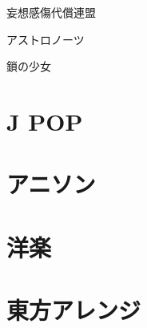 \documentclass[12pt, dvipdfmx]{jsarticle}
\begin{document}
妄想感傷代償連盟

アストロノーツ

鎖の少女

\section{J POP}



\section{アニソン}



\section{洋楽}




\section{東方アレンジ}
\end{document}
